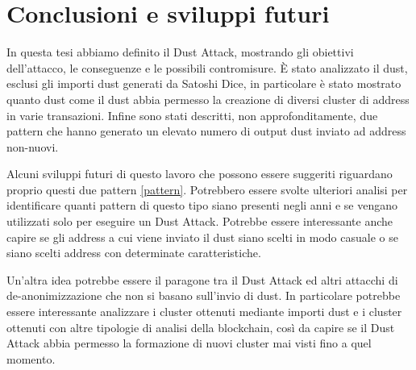 \chapter{Conclusioni e sviluppi futuri}
In questa tesi abbiamo definito il Dust Attack, mostrando gli obiettivi dell'attacco, le conseguenze e le possibili contromisure. È stato analizzato il dust, esclusi gli importi dust generati da Satoshi Dice, in particolare è stato mostrato quanto dust come il dust abbia permesso la creazione di diversi cluster di address in varie transazioni. Infine sono stati descritti, non approfonditamente, due pattern che hanno generato un elevato numero di output dust inviato ad address non-nuovi. 

Alcuni sviluppi futuri di questo lavoro che possono essere suggeriti riguardano proprio questi due pattern \ref{pattern}. Potrebbero essere svolte ulteriori analisi per identificare quanti pattern di questo tipo siano presenti negli anni e se vengano utilizzati solo per eseguire un Dust Attack. Potrebbe essere interessante anche capire se gli address a cui viene inviato il dust siano scelti in modo casuale o se siano scelti address con determinate caratteristiche. 

Un'altra idea potrebbe essere il paragone tra il Dust Attack ed altri attacchi di de-anonimizzazione che non si basano sull'invio di dust. In particolare potrebbe essere interessante analizzare i cluster ottenuti mediante importi dust e i cluster ottenuti con altre tipologie di analisi della blockchain, così da capire se il Dust Attack abbia permesso la formazione di nuovi cluster mai visti fino a quel momento.
